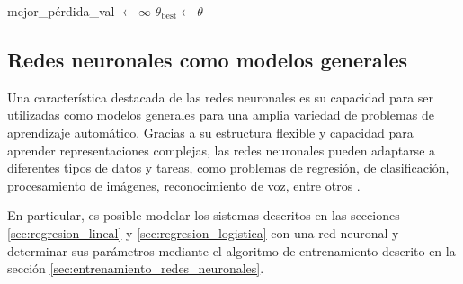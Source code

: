 \begin{algorithm}[H]
    \caption[Ciclo de entrenamiento con guardado del mejor modelo]{Ciclo de entrenamiento con guardado del mejor modelo.}
  \label{alg:training_loop}
  \BlankLine
  mejor\_pérdida\_val $\leftarrow \infty$\;
  $\theta_{\text{best}} \leftarrow \theta$\;
  \BlankLine
\end{algorithm}

\subsection{Redes neuronales como modelos generales}
\label{sec:redes_neuronales_como_modelos_generales}
Una característica destacada de las redes neuronales es su capacidad para ser utilizadas como modelos generales para una amplia variedad de problemas de aprendizaje automático. Gracias a su estructura flexible y capacidad para aprender representaciones complejas, las redes neuronales pueden adaptarse a diferentes tipos de datos y tareas, como problemas de regresión, de clasificación, procesamiento de imágenes, reconocimiento de voz, entre otros \cite{Goodfellow2016}.

En particular, es posible modelar los sistemas descritos en las secciones \ref{sec:regresion_lineal} y \ref{sec:regresion_logistica} con una red neuronal y determinar sus parámetros mediante el algoritmo de entrenamiento descrito en la sección \ref{sec:entrenamiento_redes_neuronales}.

